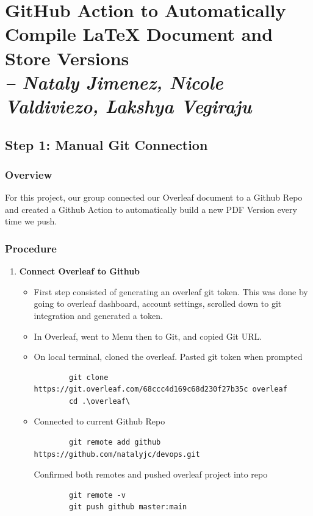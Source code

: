 \chapter{GitHub Action to Automatically Compile  LaTeX Document and Store Versions \\
\small{\textit{-- Nataly Jimenez, Nicole Valdiviezo, Lakshya Vegiraju}}
\label{Chapter::Github}}

\section{Step 1: Manual Git Connection}

\subsection{Overview}
For this project, our group connected our Overleaf document to a Github Repo and created a Github Action to automatically build a new PDF Version every time we push. 

\subsection{Procedure}
\begin{enumerate}
    \item \textbf{Connect Overleaf to Github}
    \begin{itemize}
        \item First step consisted of generating an overleaf git token. This was done by going to overleaf dashboard, account settings, scrolled down to git integration and generated a token.  
        \item In Overleaf, went to Menu then to Git, and copied Git URL. 
        \item On local terminal, cloned the overleaf. Pasted git token when prompted
        \begin{verbatim}
        git clone https://git.overleaf.com/68ccc4d169c68d230f27b35c overleaf
        cd .\overleaf\
        \end{verbatim}
        \item Connected to current Github Repo
        \begin{verbatim}
        git remote add github https://github.com/natalyjc/devops.git
        \end{verbatim}
        Confirmed both remotes and pushed overleaf project into repo
        \begin{verbatim}
        git remote -v
        git push github master:main
        \end{verbatim} 
    \end{itemize}
\end{enumerate}

